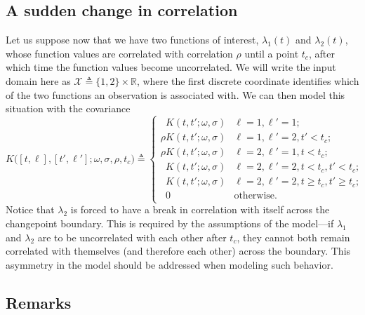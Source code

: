 \documentclass{article}
\newcommand{\deq}{\triangleq}
\newcommand{\cm}[1]{\mathcal{#1}}
\newcommand{\R}{\mathbb{R}}
\begin{document}
\subsection{A sudden change in correlation}

Let us suppose now that we have two functions of interest,
$\lambda_1(t)$ and $\lambda_2(t)$, whose function values are
correlated with correlation $\rho$ until a point $t_c$, after which
time the function values become uncorrelated.  We will write the input
domain here as $\cm{X} \deq \lbrace 1, 2 \rbrace \times \R$, where the
first discrete coordinate identifies which of the two functions an
observation is associated with.  We can then model this situation with
the covariance
\begin{equation}
  \label{correlation}
  K\bigl( [t, \ell], [t', \ell'] ; \omega, \sigma, \rho, t_c \bigr)
  \deq
  \begin{cases}
    \phantom{\rho}K(t, t'; \omega, \sigma) 
    & \ell = 1, \ell' = 1; \\
    \rho K(t, t'; \omega, \sigma) 
    & \ell = 1, \ell' = 2, t' < t_c; \\
    \rho K(t, t'; \omega, \sigma) 
    & \ell = 2, \ell' = 1, t < t_c; \\
    \phantom{\rho}K(t, t'; \omega, \sigma) 
    & \ell = 2, \ell' = 2, t < t_c, t' < t_c; \\
    \phantom{\rho}K(t, t'; \omega, \sigma) 
    & \ell = 2, \ell' = 2, t \geq t_c, t' \geq t_c; \\
    \phantom{\rho}0 & \text{otherwise.}
  \end{cases}
\end{equation}
Notice that $\lambda_2$ is forced to have a break in correlation with
itself across the changepoint boundary.  This is required by the
assumptions of the model---if $\lambda_1$ and $\lambda_2$ are to be
uncorrelated with each other after $t_c$, they cannot both remain
correlated with themselves (and therefore each other) across the
boundary.  This asymmetry in the model should be addressed when
modeling such behavior.

\subsection{Remarks}
\end{document}
